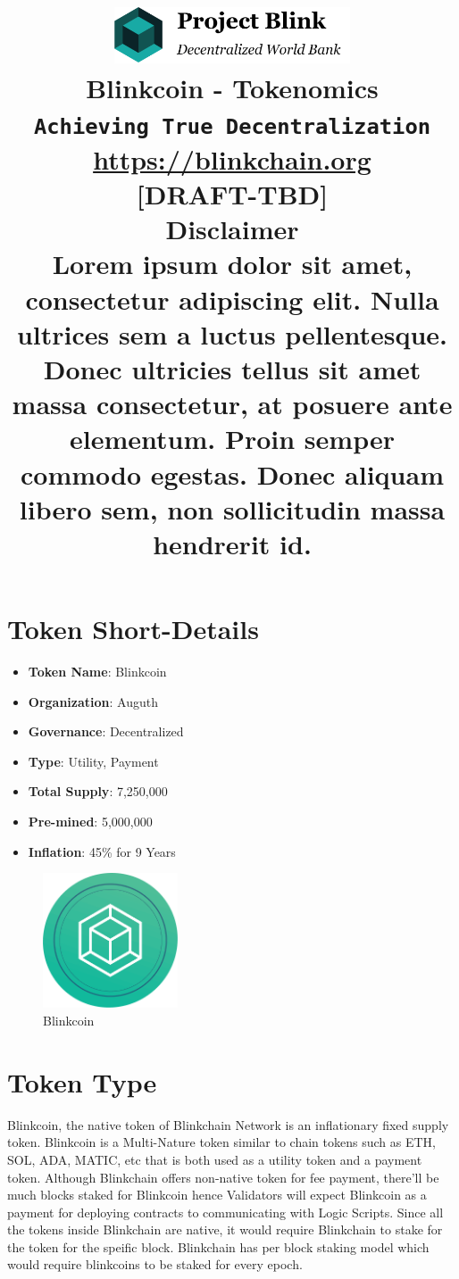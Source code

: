 \documentclass[a4paper,12pt]{article}
\title{

\centering
\includegraphics[width=7cm]{logo}\\
\vspace{5mm}
Blinkcoin - Tokenomics\\
\texttt{\normalsize{Achieving True Decentralization}}\\
\vspace{2mm}
\footnotesize{\url{https://blinkchain.org}}\\
\vspace{3mm}
\small{[DRAFT-TBD]}\\
\vspace{8mm}
\small{\textbf{Disclaimer}}\\
\justifying
\small{Lorem ipsum dolor sit amet, consectetur adipiscing elit. Nulla ultrices sem a luctus pellentesque. Donec ultricies tellus sit amet massa consectetur, at posuere ante elementum. Proin semper commodo egestas. Donec aliquam libero sem, non sollicitudin massa hendrerit id.}

}
\date{\vspace{-5ex}}
\begin{document}
\maketitle

\section{Token Short-Details}

\begin{multicols}{2}

\begin{itemize}
\item \textbf{Token Name}: Blinkcoin
\item \textbf{Organization}: Auguth
\item \textbf{Governance}: Decentralized
\item \textbf{Type}: Utility, Payment
\item \textbf{Total Supply}: 7,250,000
\item \textbf{Pre-mined}: 5,000,000
\item \textbf{Inflation}: 45\% for 9 Years
\end{itemize}


\begin{center}
\begin{figure}[H]
\centering
\includegraphics[width=4cm]{blinkcoin}
\caption{Blinkcoin}
\end{figure}
\end{center}

\end{multicols}

\section{Token Type}

Blinkcoin, the native token of Blinkchain Network is an inflationary fixed supply token. Blinkcoin is a Multi-Nature token similar to chain tokens such as ETH, SOL, ADA, MATIC, etc that is both used as a utility token and a payment token. Although Blinkchain offers non-native token for fee payment, there'll be much blocks staked for Blinkcoin hence Validators will expect Blinkcoin as a payment for deploying contracts to communicating with Logic Scripts. Since all the tokens inside Blinkchain are native, it would require Blinkchain to stake for the token for the speific block. Blinkchain has per block staking model which would require blinkcoins to be staked for every epoch.\\
\end{document}
